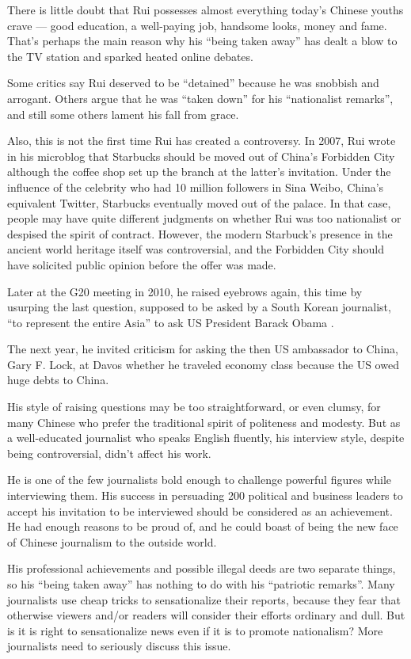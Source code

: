 \begin{displayquote}
	There is little doubt that Rui possesses almost everything today's
	Chinese youths crave — good education, a well-paying job, handsome
	looks, money and fame. That's perhaps the main reason why his ``being
	taken away'' has dealt a blow to the TV station and sparked heated
	online debates.

	Some critics say Rui deserved to be ``detained'' because he was snobbish
	and arrogant. Others argue that he was ``taken down'' for his
	``nationalist remarks'', and still some others lament his fall from
	grace.

	Also, this is not the first time Rui has created a controversy. In 2007,
	Rui wrote in his microblog that Starbucks should be moved out of China's
	Forbidden City although the coffee shop set up the branch at the
	latter's invitation.  Under the influence of the celebrity who had 10
	million followers in Sina Weibo, China's equivalent Twitter, Starbucks
	eventually moved out of the palace. In that case, people may have quite
	different judgments on whether Rui was too nationalist or despised the
	spirit of contract. However, the modern Starbuck's presence in the
	ancient world heritage itself was controversial, and the Forbidden City
	should have solicited public opinion before the offer was made.

	Later at the G20 meeting in 2010, he raised eyebrows again, this time by
	usurping the last question, supposed to be asked by a South Korean
	journalist, ``to represent the entire Asia'' to ask US President Barack
	Obama .

	The next year, he invited criticism for asking the then US ambassador to
	China, Gary F. Lock, at Davos whether he traveled economy class because
	the US owed huge debts to China.

	His style of raising questions may be too straightforward, or even
	clumsy, for many Chinese who prefer the traditional spirit of politeness
	and modesty. But as a well-educated journalist who speaks English
	fluently, his interview style, despite being controversial, didn't
	affect his work.

	He is one of the few journalists bold enough to challenge powerful
	figures while interviewing them. His success in persuading 200 political
	and business leaders to accept his invitation to be interviewed should
	be considered as an achievement. He had enough reasons to be proud of,
	and he could boast of being the new face of Chinese journalism to the
	outside world.

	His professional achievements and possible illegal deeds are two
	separate things, so his “being taken away” has nothing to do with his
	“patriotic remarks”. Many journalists use cheap tricks to sensationalize
	their reports, because they fear that otherwise viewers and/or readers
	will consider their efforts ordinary and dull. But is it is right to
	sensationalize news even if it is to promote nationalism? More
	journalists need to seriously discuss this issue.


\end{displayquote}
